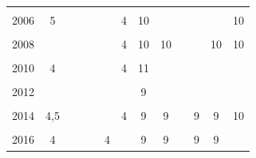 \documentclass[12pt]{article}\usepackage[]{graphicx}\usepackage[]{color}
\begin{document}
\begin{landscapepage}
\begin{table}[!h]
{\begin{tabular}[t]{>{}c|ccccc>{}c|cccccc}
\cellcolor{gray!6}{2005} & \cellcolor{gray!6}{4} & \cellcolor{gray!6}{} & \cellcolor{gray!6}{} & \cellcolor{gray!6}{} & \cellcolor{gray!6}{} & \cellcolor{gray!6}{4} & \cellcolor{gray!6}{10} & \cellcolor{gray!6}{} & \cellcolor{gray!6}{} & \cellcolor{gray!6}{} & \cellcolor{gray!6}{10} & \cellcolor{gray!6}{10}\\
2006 & 5 &  &  &  &  & 4 & 10 &  &  &  &  & 10\\
\cellcolor{gray!6}{2007} & \cellcolor{gray!6}{4} & \cellcolor{gray!6}{} & \cellcolor{gray!6}{4} & \cellcolor{gray!6}{} & \cellcolor{gray!6}{4} & \cellcolor{gray!6}{4} & \cellcolor{gray!6}{10} & \cellcolor{gray!6}{} & \cellcolor{gray!6}{} & \cellcolor{gray!6}{} & \cellcolor{gray!6}{10} & \cellcolor{gray!6}{10}\\
2008 &  &  &  &  &  & 4 & 10 & 10 &  &  & 10 & 10\\
\cellcolor{gray!6}{2009} & \cellcolor{gray!6}{4} & \cellcolor{gray!6}{4} & \cellcolor{gray!6}{4} & \cellcolor{gray!6}{4} & \cellcolor{gray!6}{4} & \cellcolor{gray!6}{4} & \cellcolor{gray!6}{10} & \cellcolor{gray!6}{} & \cellcolor{gray!6}{} & \cellcolor{gray!6}{} & \cellcolor{gray!6}{} & \cellcolor{gray!6}{10}\\
2010 & 4 &  &  &  &  & 4 & 11 &  &  &  &  & \\
\cellcolor{gray!6}{2011} & \cellcolor{gray!6}{4} & \cellcolor{gray!6}{} & \cellcolor{gray!6}{} & \cellcolor{gray!6}{} & \cellcolor{gray!6}{} & \cellcolor{gray!6}{4} & \cellcolor{gray!6}{9} & \cellcolor{gray!6}{} & \cellcolor{gray!6}{} & \cellcolor{gray!6}{} & \cellcolor{gray!6}{} & \cellcolor{gray!6}{10}\\
2012 &  &  &  &  &  &  & 9 &  &  &  &  & \\
\cellcolor{gray!6}{2013} & \cellcolor{gray!6}{4} & \cellcolor{gray!6}{4} & \cellcolor{gray!6}{4} & \cellcolor{gray!6}{} & \cellcolor{gray!6}{} & \cellcolor{gray!6}{4} & \cellcolor{gray!6}{9} & \cellcolor{gray!6}{9} & \cellcolor{gray!6}{9} & \cellcolor{gray!6}{9} & \cellcolor{gray!6}{9} & \cellcolor{gray!6}{9}\\
2014 & 4,5 &  &  &  &  & 4 & 9 & 9 &  & 9 & 9 & 10\\
\cellcolor{gray!6}{2015} & \cellcolor{gray!6}{4} & \cellcolor{gray!6}{4} & \cellcolor{gray!6}{4} & \cellcolor{gray!6}{4} & \cellcolor{gray!6}{4} & \cellcolor{gray!6}{4} & \cellcolor{gray!6}{10} & \cellcolor{gray!6}{} & \cellcolor{gray!6}{9} & \cellcolor{gray!6}{9} & \cellcolor{gray!6}{9} & \cellcolor{gray!6}{9}\\
2016 & 4 &  &  &  & 4 &  & 9 & 9 &  & 9 & 9 & \\

\end{tabular}}
\end{table}
\end{landscapepage}
\end{document}
